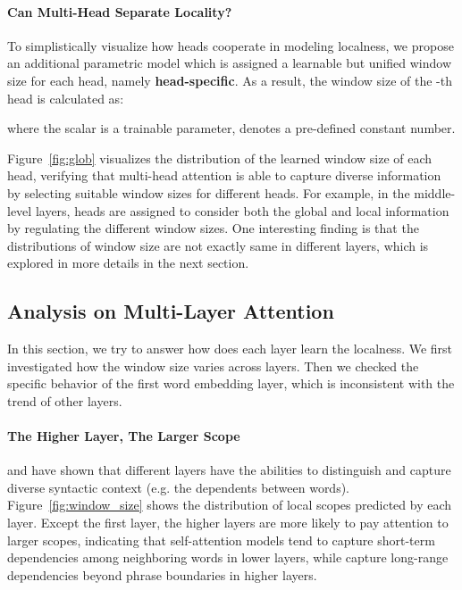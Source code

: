 \documentclass[11pt,a4paper]{article}
\begin{document}
\paragraph{Can Multi-Head Separate Locality?}

To simplistically visualize how heads cooperate in modeling localness, we propose an additional parametric model which is assigned a learnable but unified window size for each head, namely {\bf head-specific}. As a result, the window size  of the -th head is calculated as:
     
where the scalar  is a trainable parameter,  denotes a pre-defined constant number. 

Figure~\ref{fig:glob} visualizes the distribution of the learned window size of each head, verifying that multi-head attention is able to capture diverse information by selecting suitable window sizes for different heads.
For example, in the middle-level layers, heads are assigned to consider both the global and local information by regulating the different window sizes. One interesting finding is that the distributions of window size are not exactly same in different layers, which is explored in more details in the next section.




\subsection{Analysis on Multi-Layer Attention}
\label{sec:multilayer}

In this section, we try to answer how does each layer learn the localness. We first investigated how the window size varies across layers. Then we checked the specific behavior of the first word embedding layer, which is inconsistent with the trend of other layers.

\paragraph{The Higher Layer, The Larger Scope}   and  have shown that different layers have the abilities to distinguish and capture diverse syntactic context (e.g. the dependents between words). Figure~\ref{fig:window_size} shows the distribution of local scopes predicted by each layer. Except the first layer, the higher layers are more likely to pay attention to larger scopes, indicating that self-attention models tend to capture short-term dependencies among neighboring words in lower layers, while capture long-range dependencies beyond phrase boundaries in higher layers.
\end{document}
